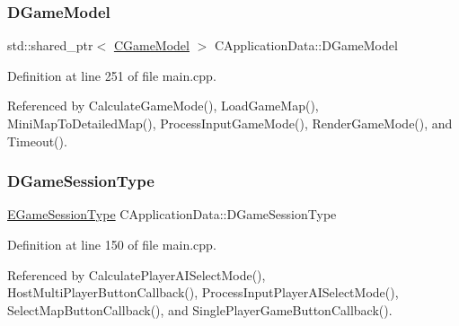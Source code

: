 \hypertarget{classCApplicationData_a32b50c7c1cbac3cfd67c7f775b1d6fee}{}\label{classCApplicationData_a32b50c7c1cbac3cfd67c7f775b1d6fee} 
\subsubsection{\texorpdfstring{D\+Game\+Model}{DGameModel}}
{\footnotesize\ttfamily std\+::shared\+\_\+ptr$<$ \hyperlink{classCGameModel}{C\+Game\+Model} $>$ C\+Application\+Data\+::\+D\+Game\+Model\hspace{0.3cm}{\ttfamily [protected]}}



Definition at line 251 of file main.\+cpp.



Referenced by Calculate\+Game\+Mode(), Load\+Game\+Map(), Mini\+Map\+To\+Detailed\+Map(), Process\+Input\+Game\+Mode(), Render\+Game\+Mode(), and Timeout().

\hypertarget{classCApplicationData_acd2cc6f5bbb325532c21afc38241c3de}{}\label{classCApplicationData_acd2cc6f5bbb325532c21afc38241c3de} 
\subsubsection{\texorpdfstring{D\+Game\+Session\+Type}{DGameSessionType}}
{\footnotesize\ttfamily \hyperlink{classCApplicationData_a0ec00515bf6b4b469b43ad62d615e3fa}{E\+Game\+Session\+Type} C\+Application\+Data\+::\+D\+Game\+Session\+Type\hspace{0.3cm}{\ttfamily [protected]}}



Definition at line 150 of file main.\+cpp.



Referenced by Calculate\+Player\+A\+I\+Select\+Mode(), Host\+Multi\+Player\+Button\+Callback(), Process\+Input\+Player\+A\+I\+Select\+Mode(), Select\+Map\+Button\+Callback(), and Single\+Player\+Game\+Button\+Callback().

\hypertarget{classCApplicationData_a0577767a7fa045a51654b881608b1e7a}{}\label{classCApplicationData_a0577767a7fa045a51654b881608b1e7a} 
